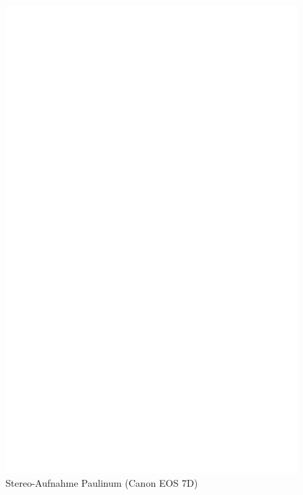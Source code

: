 \documentclass[liststotoc,bibtotoc,fontsize=14pt,]{scrreprt}
\begin{document}
	\newpage
	\begin{figure}[h]
		\includegraphics[width=\linewidth]{img/ph.jpg}
		\caption{Stereo-Aufnahme Paulinum (Canon EOS 7D)}
	\end{figure}
	
\end{document}
